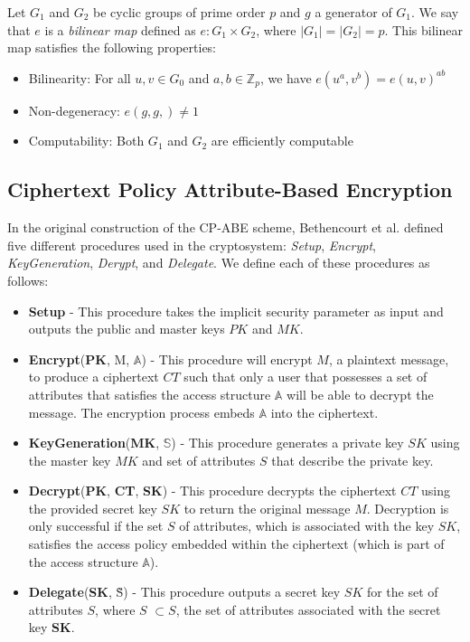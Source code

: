 \documentclass{sig-alternate}
\newenvironment{definition}[1][Definition]{\begin{trivlist}
\item[\hskip \labelsep {\bfseries #1}]}{\end{trivlist}}
\begin{document}
\begin{definition}
Let $G_1$ and $G_2$ be cyclic groups of prime order $p$ and $g$ a generator of $G_1$. We say that $e$ is a \emph{bilinear map} defined as $e : G_1 \times G_2$, where $|G_1| = |G_2| = p$. This bilinear map satisfies the following properties:
\begin{itemize}
	\item Bilinearity: For all $u, v \in G_0$ and $a, b \in \mathbb{Z}_p$, we have $e(u^a, v^b) = e(u,v)^{ab}$
	\item Non-degeneracy: $e(g, g,) \not= 1$
	\item Computability: Both $G_1$ and $G_2$ are efficiently computable
\end{itemize}
\end{definition}

\subsection{Ciphertext Policy Attribute-Based Encryption}
In the original construction of the CP-ABE scheme, Bethencourt et al. \cite{Bethencourt2007-CPABE} defined five different procedures 
used in the cryptosystem: \emph{Setup}, \emph{Encrypt}, \emph{KeyGeneration}, \emph{Derypt}, and 
\emph{Delegate}. We define each of these procedures as follows:
\begin{itemize}
	\item \textbf{Setup} - This procedure takes the implicit security parameter as input and outputs the public and master keys $PK$ and $MK$.
	\item \textbf{Encrypt}(\textbf{PK}, M, $\mathbb{A}$) - This procedure will encrypt $M$, a plaintext message, to produce a ciphertext $CT$ such that only a user that possesses a set of attributes that satisfies the access structure $\mathbb{A}$ will be able to decrypt the message. The encryption process embeds $\mathbb{A}$ into the ciphertext.
	\item \textbf{KeyGeneration}(\textbf{MK}, $\mathbb{S}$) - This procedure generates a private key $SK$ using the master key $MK$ and set of attributes $S$ that describe the private key. 
	\item \textbf{Decrypt}(\textbf{PK}, \textbf{CT}, \textbf{SK}) - This procedure decrypts the ciphertext $CT$ using the provided secret key $SK$ to return the original message $M$. Decryption is only successful if the set $S$ of attributes, which is associated with the key $SK$, satisfies the access policy embedded within the ciphertext (which is part of the access structure $\mathbb{A}$).
	\item \textbf{Delegate}(\textbf{SK}, \~{S}) - This procedure outputs a secret key \~{$SK$} for the set of attributes \~{$S$}, where \~{$S$} $\subset S$, the set of attributes associated with the secret key \textbf{SK}.
\end{itemize}
\end{document}
